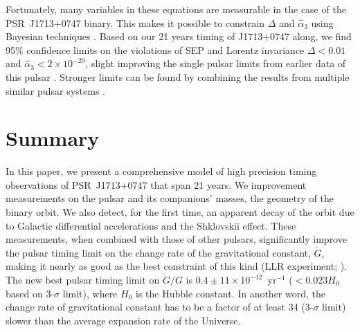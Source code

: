 Fortunately, many variables in these equations are measurable in the
case of the PSR~J1713+0747 binary. This makes it possible to constrain $\Delta$
and $\hat{\alpha}_3$ using Bayesian techniques 
\citep{sns+05, sfl+05, gsf+11}. Based on our 21 years 
timing of J1713+0747 along, we find 95\% confidence limits on the violations of SEP and
Lorentz invariance $\Delta < 0.01$ and $\hat{\alpha}_3<2\times10^{-20}$, 
slight improving the single pulsar limits from earlier data of this pulsar \citep{sfl+05, gsf+11}.
Stronger limits can be found by combining the results from
multiple similar pulsar systems \citep{wex00,sfl+05, gsf+11}.


\section{Summary}
In this paper, we present a comprehensive model of high precision timing observations of
PSR~J1713+0747 that span 21 years. 
We improvement measurements on the pulsar and its companions' masses, the
geometry of the binary orbit. We also detect, for the first time, an apparent
decay of the orbit due to Galactic differential accelerations and the Shklovskii effect.
These measurements, when combined with those of other pulsars, 
significantly improve the pulsar timing limit on the change rate of the gravitational
 constant, $\dot{G}$, making it nearly as good as the best
 constraint of this kind (LLR experiment; \citep{hmb10}).
The new best pulsar timing limit on $\dot{G}/G$ is 
$0.4\pm11\times10^{-12}$~yr$^{-1}$ ($<0.023H_0$ based on 3-$\sigma$ limit), where $H_0$ is the Hubble constant. 
In another word, the change rate of gravitational constant has to be a factor
of at least $34$ (3-$\sigma$ limit) slower than the average expansion rate of
the Universe.

